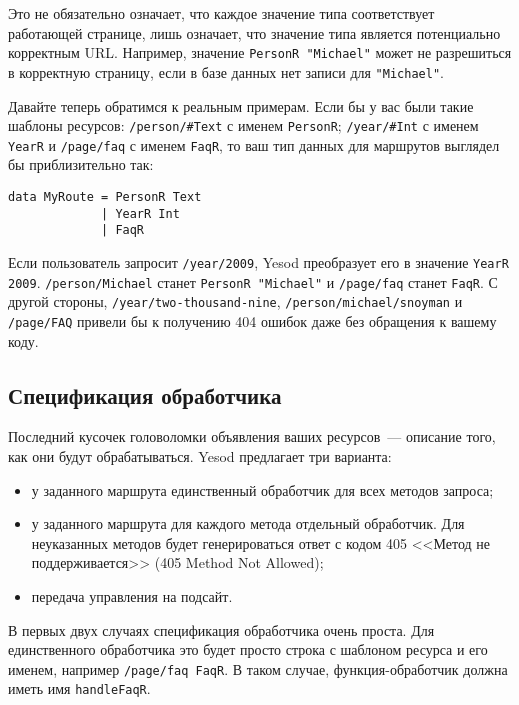 \begin{remark}
  Это не обязательно означает, что каждое значение типа соответствует работающей странице,
  лишь означает, что значение типа является потенциально корректным URL. Например,
  значение \lstinline!PersonR "Michael"! может не разрешиться в корректную страницу, если
  в базе данных нет записи для \lstinline!"Michael"!.
\end{remark}

Давайте теперь обратимся к реальным примерам. Если бы у вас были такие
шаблоны ресурсов: \lstinline!/person/#Text! с именем
\lstinline!PersonR!; \lstinline!/year/#Int! с именем
\lstinline!YearR! и \lstinline!/page/faq! с именем \lstinline!FaqR!,
то ваш тип данных для маршрутов выглядел бы приблизительно так:
\begin{lstlisting}
data MyRoute = PersonR Text
             | YearR Int
             | FaqR
\end{lstlisting}

Если пользователь запросит \lstinline!/year/2009!,
Yesod преобразует его в значение \lstinline!YearR 2009!.
\lstinline!/person/Michael! станет \lstinline!PersonR "Michael"!
и \lstinline!/page/faq! станет \lstinline!FaqR!. С другой
стороны, \lstinline!/year/two-thousand-nine!,
\lstinline!/person/michael/snoyman! и \lstinline!/page/FAQ! привели бы
к получению 404 ошибок даже без обращения к вашему коду.

\subsection{Спецификация обработчика}
Последний кусочек головоломки объявления ваших ресурсов~--- описание
того, как они будут обрабатываться. Yesod предлагает три варианта:
\begin{itemize}
\item у заданного маршрута единственный обработчик для всех методов запроса;
\item у заданного маршрута для каждого метода отдельный
  обработчик. Для неуказанных методов будет генерироваться ответ с
  кодом 405 <<Метод не поддерживается>> (405 Method Not Allowed);
\item передача управления на подсайт.
\end{itemize}

В первых двух случаях спецификация обработчика очень проста. Для
единственного обработчика это будет просто строка с шаблоном ресурса и
его именем, например \lstinline!/page/faq FaqR!. В таком
случае, функция-обработчик должна иметь имя \lstinline!handleFaqR!.

